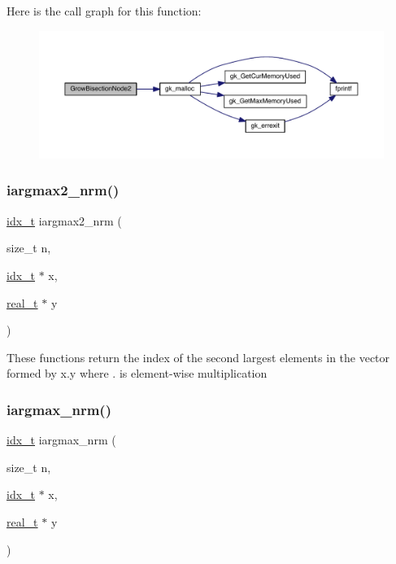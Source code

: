Here is the call graph for this function\+:\nopagebreak
\begin{figure}[H]
\begin{center}
\leavevmode
\includegraphics[width=350pt]{a00945_a3668b93d256689991e65a85536f533c5_cgraph}
\end{center}
\end{figure}
\mbox{\label{a00945_aabb1102c71eff67321b7fbaad8aeb67c}} 
\subsubsection{\texorpdfstring{iargmax2\+\_\+nrm()}{iargmax2\_nrm()}}
{\footnotesize\ttfamily \hyperlink{a00876_aaa5262be3e700770163401acb0150f52}{idx\+\_\+t} iargmax2\+\_\+nrm (\begin{DoxyParamCaption}\item[{size\+\_\+t}]{n,  }\item[{\hyperlink{a00876_aaa5262be3e700770163401acb0150f52}{idx\+\_\+t} $\ast$}]{x,  }\item[{\hyperlink{a00876_a1924a4f6907cc3833213aba1f07fcbe9}{real\+\_\+t} $\ast$}]{y }\end{DoxyParamCaption})}

These functions return the index of the second largest elements in the vector formed by x.\+y where \textquotesingle{}.\textquotesingle{} is element-\/wise multiplication \mbox{\label{a00945_a156c57a10f383c2b1f9543e0092c1cfe}} 
\subsubsection{\texorpdfstring{iargmax\+\_\+nrm()}{iargmax\_nrm()}}
{\footnotesize\ttfamily \hyperlink{a00876_aaa5262be3e700770163401acb0150f52}{idx\+\_\+t} iargmax\+\_\+nrm (\begin{DoxyParamCaption}\item[{size\+\_\+t}]{n,  }\item[{\hyperlink{a00876_aaa5262be3e700770163401acb0150f52}{idx\+\_\+t} $\ast$}]{x,  }\item[{\hyperlink{a00876_a1924a4f6907cc3833213aba1f07fcbe9}{real\+\_\+t} $\ast$}]{y }\end{DoxyParamCaption})}

